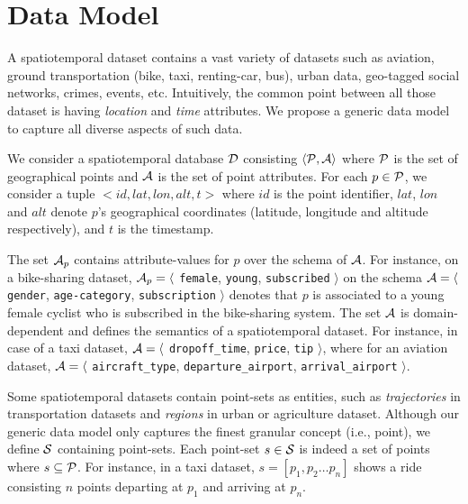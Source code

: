 \section{Data Model}\label{sec:data-model}
A spatiotemporal dataset contains a vast variety of datasets such as aviation, ground transportation (bike, taxi, renting-car, bus), urban data, geo-tagged social networks, crimes, events, etc. Intuitively, the common point between all those dataset is having {\em location} and {\em time} attributes. We propose a generic data model to capture all diverse aspects of such data. 

We consider a spatiotemporal database ${\cal D}$ consisting $\langle {\cal P}, {\cal A} \rangle$ where ${\cal P}$ is the set of
geographical points and ${\cal A}$ is the set of point attributes. For each $p \in {\cal P}$, we consider a tuple $<id, lat, lon, alt, t>$ where $id$ is the point identifier, $lat$, $lon$ and $alt$ denote $p$'s geographical coordinates (latitude, longitude and altitude respectively), and $t$ is the timestamp.

The set ${\cal A}_p$ contains attribute-values for $p$ over the schema of ${\cal A}$. For instance, on a bike-sharing dataset, ${\cal A}_p = \langle $ {\tt female}, {\tt young}, {\tt subscribed} $\rangle$ on the schema ${\cal A} = \langle$ {\tt gender}, {\tt age-category}, {\tt subscription} $\rangle$ denotes that $p$ is associated to a young female cyclist who is subscribed in the bike-sharing system. The set ${\cal A}$ is domain-dependent and defines the semantics of a spatiotemporal dataset. For instance, in case of a taxi dataset, ${\cal A} = \langle$ {\tt dropoff\_time}, {\tt price}, {\tt tip} $\rangle$, where for an aviation dataset, ${\cal A} = \langle$ {\tt aircraft\_type}, {\tt departure\_airport}, {\tt arrival\_airport} $\rangle$.

Some spatiotemporal datasets contain point-sets as entities, such as {\em trajectories} in transportation datasets and {\em regions} in urban or agriculture dataset. Although our generic data model only captures the finest granular concept (i.e., point), we define ${\cal S}$ containing point-sets. Each point-set $s \in {\cal S}$ is indeed a set of points where $s \subseteq {\cal P}$. For instance, in a taxi dataset, $s = [ p_1, p_2 \dots p_n ]$ shows a ride consisting $n$ points departing at $p_1$ and arriving at $p_n$.